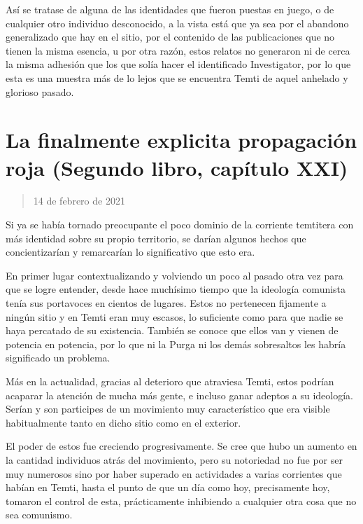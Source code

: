 \documentclass[
]{book}
\begin{document}
Así se tratase de alguna de las identidades que fueron puestas en juego, o de cualquier otro individuo desconocido, a la vista está que ya sea por el abandono generalizado que hay en el sitio, por el contenido de las publicaciones que no tienen la misma esencia, u por otra razón, estos relatos no generaron ni de cerca la misma adhesión que los que solía hacer el identificado Investigator, por lo que esta es una muestra más de lo lejos que se encuentra Temti de aquel anhelado y glorioso pasado.

\hypertarget{la-finalmente-explicita-propagaciuxf3n-roja-segundo-libro-capuxedtulo-xxi}{%
\section{La finalmente explicita propagación roja (Segundo libro, capítulo XXI)}\label{la-finalmente-explicita-propagaciuxf3n-roja-segundo-libro-capuxedtulo-xxi}}

\begin{quote}
14 de febrero de 2021
\end{quote}

Si ya se había tornado preocupante el poco dominio de la corriente temtitera con más identidad sobre su propio territorio, se darían algunos hechos que concientizarían y remarcarían lo significativo que esto era.

En primer lugar contextualizando y volviendo un poco al pasado otra vez para que se logre entender, desde hace muchísimo tiempo que la ideología comunista tenía sus portavoces en cientos de lugares. Estos no pertenecen fijamente a ningún sitio y en Temti eran muy escasos, lo suficiente como para que nadie se haya percatado de su existencia. También se conoce que ellos van y vienen de potencia en potencia, por lo que ni la Purga ni los demás sobresaltos les habría significado un problema.

Más en la actualidad, gracias al deterioro que atraviesa Temti, estos podrían acaparar la atención de mucha más gente, e incluso ganar adeptos a su ideología. Serían y son participes de un movimiento muy característico que era visible habitualmente tanto en dicho sitio como en el exterior.

El poder de estos fue creciendo progresivamente. Se cree que hubo un aumento en la cantidad individuos atrás del movimiento, pero su notoriedad no fue por ser muy numerosos sino por haber superado en actividades a varias corrientes que habían en Temti, hasta el punto de que un día como hoy, precisamente hoy, tomaron el control de esta, prácticamente inhibiendo a cualquier otra cosa que no sea comunismo.
\end{document}
